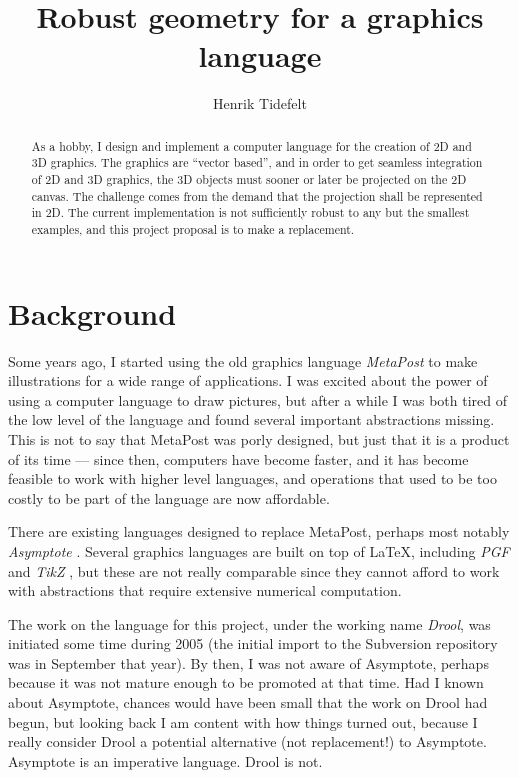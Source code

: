 \documentclass[a4paper]{article}
\title{Robust geometry for a graphics language}
\author{Henrik Tidefelt}
\begin{document}
\maketitle

\begin{abstract}
  As a hobby, I design and implement a computer language for the creation of 2D and 3D graphics.  The graphics are ``vector based'', and in order to get seamless integration of 2D and 3D graphics, the 3D objects must sooner or later be projected on the 2D canvas.  The challenge comes from the demand that the projection shall be represented in 2D.  The current implementation is not sufficiently robust to any but the smallest examples, and this project proposal is to make a replacement.
\end{abstract}

\section*{Background}%
%
Some years ago, I started using the old graphics language \emph{MetaPost} \citep{Hobby94MetaPost} to make illustrations for a wide range of applications.  I was excited about the power of using a computer language to draw pictures, but after a while I was both tired of the low level of the language and found several important abstractions missing.  This is not to say that MetaPost was porly designed, but just that it is a product of its time --- since then, computers have become faster, and it has become feasible to work with higher level languages, and operations that used to be too costly to be part of the language are now affordable.

There are existing languages designed to replace MetaPost, perhaps most notably \emph{Asymptote} \citep{Asymptote_1.29}.  Several graphics languages are built on top of \LaTeX{}, including \emph{PGF} and \emph{TikZ} \citep{TikZ_PGF_1.00}, but these are not really comparable since they cannot afford to work with abstractions that require extensive numerical computation.

The work on the language for this project, under the working name \emph{Drool}, was initiated some time during 2005 (the initial import to the Subversion repository was in September that year).  By then, I was not aware of Asymptote, perhaps because it was not mature enough to be promoted at that time.  Had I known about Asymptote, chances would have been small that the work on Drool had begun, but looking back I am content with how things turned out, because I really consider Drool a potential alternative (not replacement!) to Asymptote.  Asymptote is an imperative language.  Drool is not.
\end{document}
